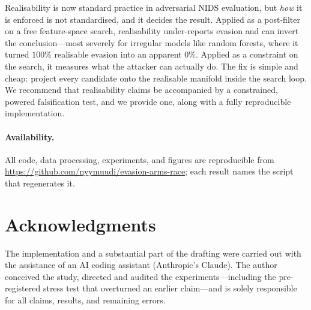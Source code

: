 \documentclass[10pt,twocolumn]{article}
\begin{document}
Realisability is now standard practice in adversarial NIDS evaluation, but
\emph{how} it is enforced is not standardised, and it decides the result.
Applied as a post-filter on a free feature-space search, realisability
under-reports evasion and can invert the conclusion---most severely for irregular
models like random forests, where it turned $100\%$ realisable evasion into an
apparent $0\%$. Applied as a constraint on the search, it measures what the
attacker can actually do. The fix is simple and cheap: project every candidate
onto the realisable manifold inside the search loop. We recommend that
realisability claims be accompanied by a constrained, powered falsification test,
and we provide one, along with a fully reproducible implementation.

\paragraph{Availability.}
All code, data processing, experiments, and figures are reproducible from
\url{https://github.com/nyymuudi/evasion-arms-race}; each result names the script
that regenerates it.

\section*{Acknowledgments}
The implementation and a substantial part of the drafting were carried out with the
assistance of an AI coding assistant (Anthropic's Claude). The author conceived the
study, directed and audited the experiments---including the pre-registered stress
test that overturned an earlier claim---and is solely responsible for all claims,
results, and remaining errors.



\end{document}
